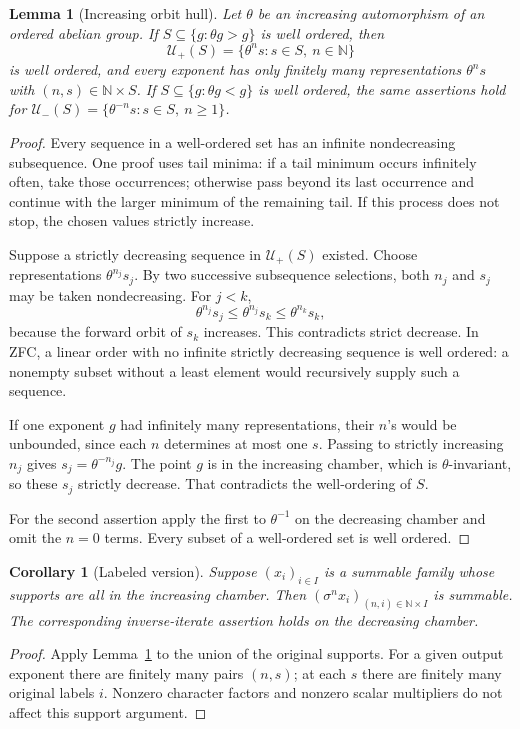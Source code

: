 \documentclass[11pt,oneside]{article}
\numberwithin{equation}{section}
\newtheorem{lemma}[theorem]{Lemma}
\newtheorem{corollary}[theorem]{Corollary}
\theoremstyle{definition}
\theoremstyle{remark}
\newcommand{\N}{\mathbb N}
\begin{document}
\begin{lemma}[Increasing orbit hull]\label{dsup:lem:orbit}
Let $\theta$ be an increasing automorphism of an ordered abelian group.
If $S\subseteq\{g:\theta g>g\}$ is well ordered, then
\[
 \mathcal U_+(S)=\{\theta^n s:s\in S,\ n\in\N\}
\]
is well ordered, and every exponent has only finitely many representations
$\theta^n s$ with $(n,s)\in\N\times S$.
If $S\subseteq\{g:\theta g<g\}$ is well ordered, the same assertions hold
for
$\mathcal U_-(S)=\{\theta^{-n}s:s\in S,\ n\ge1\}$.
\end{lemma}
\begin{proof}
Every sequence in a well-ordered set has an infinite nondecreasing
subsequence. One proof uses tail minima: if a tail minimum occurs
infinitely often, take those occurrences; otherwise pass beyond its last
occurrence and continue with the larger minimum of the remaining tail.
If this process does not stop, the chosen values strictly increase.

Suppose a strictly decreasing sequence in $\mathcal U_+(S)$ existed.
Choose representations $\theta^{n_j}s_j$. By two successive subsequence
selections, both $n_j$ and $s_j$ may be taken nondecreasing. For $j<k$,
\[
 \theta^{n_j}s_j\le\theta^{n_j}s_k\le\theta^{n_k}s_k,
\]
because the forward orbit of $s_k$ increases. This contradicts strict
decrease. In ZFC, a linear order with no infinite strictly decreasing
sequence is well ordered: a nonempty subset without a least element
would recursively supply such a sequence.

If one exponent $g$ had infinitely many representations, their $n$'s
would be unbounded, since each $n$ determines at most one $s$. Passing to
strictly increasing $n_j$ gives
$s_j=\theta^{-n_j}g$. The point $g$ is in the increasing chamber, which
is $\theta$-invariant, so these $s_j$ strictly decrease. That contradicts
the well-ordering of $S$.

For the second assertion apply the first to $\theta^{-1}$ on the decreasing
chamber and omit the $n=0$ terms. Every subset of a well-ordered set is
well ordered.
\end{proof}

\begin{corollary}[Labeled version]\label{dsup:cor:labeled}
Suppose $(x_i)_{i\in I}$ is a summable family whose supports are all in the
increasing chamber. Then $(\sigma^n x_i)_{(n,i)\in\N\times I}$ is summable.
The corresponding inverse-iterate assertion holds on the decreasing
chamber.
\end{corollary}
\begin{proof}
Apply Lemma~\ref{dsup:lem:orbit} to the union of the original supports. For a
given output exponent there are finitely many pairs $(n,s)$; at each $s$
there are finitely many original labels $i$. Nonzero character factors
and nonzero scalar multipliers do not affect this support argument.
\end{proof}
\end{document}
